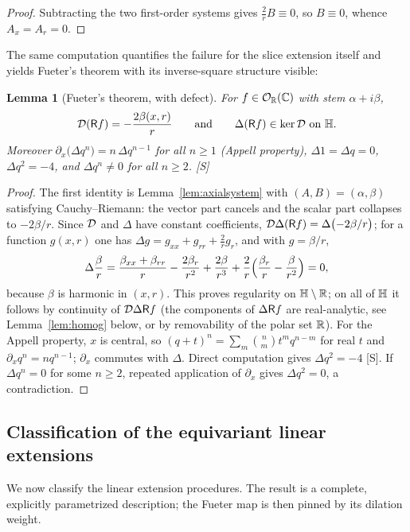\documentclass[11pt]{amsart}
\newtheorem{lemma}[theorem]{Lemma}
\theoremstyle{definition}
\theoremstyle{remark}
\begin{document}
\begin{proof}
Subtracting the two first-order systems gives $\tfrac2rB\equiv0$, so
$B\equiv0$, whence $A_x=A_r=0$.
\end{proof}

The same computation quantifies the failure for the slice extension
itself and yields Fueter's theorem with its inverse-square structure
visible:

\begin{lemma}[Fueter's theorem, with defect]\label{lem:fueter}
For $f\in\mathcal{O}_{\mathbb{R}}(\mathbb{C})$ with stem $\alpha+i\beta$,
\[
\mathcal{D}(\mathsf{R} f)=-\frac{2\beta(x,r)}{r}
\qquad\text{and}\qquad
\Delta(\mathsf{R} f)\in\ker\mathcal{D} \text{ on }\mathbb{H} .
\]
Moreover $\partial_x\bigl(\Delta q^n\bigr)=n\,\Delta q^{n-1}$ for all
$n\ge1$ \textup{(}Appell property\textup{)}, $\Delta1=\Delta q=0$,
$\Delta q^2=-4$, and $\Delta q^n\neq0$ for all $n\ge2$.  \textup{[S]}
\end{lemma}

\begin{proof}
The first identity is Lemma~\ref{lem:axialsystem} with $(A,B)=
(\alpha,\beta)$ satisfying Cauchy--Riemann: the vector part cancels and
the scalar part collapses to $-2\beta/r$.  Since $\mathcal{D}$ and $\Delta$ have
constant coefficients, $\mathcal{D}\Delta(\mathsf{R} f)=\Delta\bigl(-2\beta/r\bigr)$;
for a function $g(x,r)$ one has $\Delta g=g_{xx}+g_{rr}+\tfrac2rg_r$, and
with $g=\beta/r$,
\[
\Delta\frac{\beta}{r}
=\frac{\beta_{xx}+\beta_{rr}}{r}
-\frac{2\beta_r}{r^2}+\frac{2\beta}{r^3}
+\frac{2}{r}\Bigl(\frac{\beta_r}{r}-\frac{\beta}{r^2}\Bigr)=0,
\]
because $\beta$ is harmonic in $(x,r)$.  This proves regularity on
$\mathbb{H}\setminus\mathbb{R}$; on all of $\mathbb{H}$ it follows by continuity of
$\mathcal{D}\Delta\mathsf{R} f$ (the components of $\Delta\mathsf{R} f$ are real-analytic,
see Lemma~\ref{lem:homog} below, or by removability of the polar set
$\mathbb{R}$).  For the Appell property, $x$ is central, so
$(q+t)^n=\sum_m\binom nm t^mq^{n-m}$ for real $t$ and
$\partial_xq^n=nq^{n-1}$; $\partial_x$ commutes with $\Delta$.  Direct
computation gives $\Delta q^2=-4$ [S].  If $\Delta q^n=0$ for some
$n\ge2$, repeated application of $\partial_x$ gives $\Delta q^2=0$, a
contradiction.
\end{proof}

\subsection{Classification of the equivariant linear
extensions}\label{app:linclass}

We now classify the linear extension procedures.  The result is a
complete, explicitly parametrized description; the Fueter map is then
pinned by its dilation weight.
\end{document}
